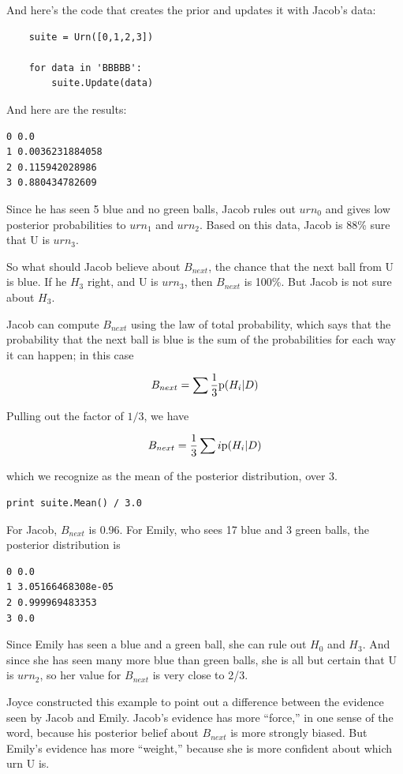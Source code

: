\documentclass[12pt]{book}
\begin{document}
And here's the code that creates the prior and updates it
with Jacob's data:

\begin{verbatim}
    suite = Urn([0,1,2,3])

    for data in 'BBBBB':
        suite.Update(data)
\end{verbatim}

And here are the results:

\begin{verbatim}
0 0.0
1 0.0036231884058
2 0.115942028986
3 0.880434782609
\end{verbatim}

Since he has seen 5 blue and no green balls, Jacob rules out $urn_0$
and gives low posterior probabilities to $urn_1$ and $urn_2$.  Based
on this data, Jacob is 88\% sure that U is $urn_3$.

So what should Jacob believe about $B_{next}$, the chance that the
next ball from U is blue.  If he $H_3$ right, and U is $urn_3$,
then $B_{next}$ is 100\%.  But Jacob is not sure about $H_3$.

Jacob can compute $B_{next}$ using the law of total probability, which
says that the probability that the next ball is blue is the sum
of the probabilities for each way it can happen; in this case

\[ B_{next} = \sum \frac{1}{3} \mathrm{p}(H_i | D) \]

Pulling out the factor of $1/3$, we have

\[ B_{next} = \frac{1}{3} \sum i \mathrm{p}(H_i | D) \]

which we recognize as the mean of the posterior distribution, over 3.

\begin{verbatim}
print suite.Mean() / 3.0
\end{verbatim}

For Jacob, $B_{next}$ is 0.96.  For Emily, who sees 17 blue and 3 green
balls, the posterior distribution is 

\begin{verbatim}
0 0.0
1 3.05166468308e-05
2 0.999969483353
3 0.0
\end{verbatim}

Since Emily has seen a blue and a green ball, she can rule out $H_0$
and $H_3$.  And since she has seen many more blue than green balls,
she is all but certain that U is $urn_2$, so her value for $B_{next}$
is very close to 2/3.

Joyce constructed this example to point out a difference between the
evidence seen by Jacob and Emily.  Jacob's evidence has more
``force,'' in one sense of the word, because his posterior belief
about $B_{next}$ is more strongly biased.  But Emily's evidence has
more ``weight,'' because she is more confident about which urn U is.
\end{document}
